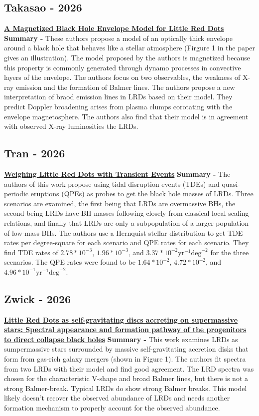 \documentclass{article}
\begin{document}
\subsection*{Takasao - 2026}
\href{https://ui.adsabs.harvard.edu/abs/2026arXiv260521589T}{\textbf{A Magnetized Black Hole Envelope Model for Little Red Dots}}
\newline \textbf{Summary -} These authors propose a model of an optically thick envelope around a black hole that behaves like a stellar atmosphere (Firgure 1 in the paper gives an illustration). The model proposed by the authors is magnetized because this property is commonly generated through dynamo processes in convective layers of the envelope. The authors focus on two observables, the weakness of X-ray emission and the formation of Balmer lines. The authors propose a new interpretation of braod emission lines in LRDs based on their model. They predict Doppler broadening arises from plasma clumps corotating with the envelope magnetosphere. The authors also find that their model is in agreement with observed X-ray luminosities the LRDs.

\subsection*{Tran - 2026}
\href{https://arxiv.org/abs/2609.00113}{\textbf{Weighing Little Red Dots with Transient Events}}
\newline \textbf{Summary -} The authors of this work propose using tidal disruption events (TDEs) and quasi-periodic eruptions (QPEs) as probes to get the black hole masses of LRDs. Three scenarios are examined, the first being that LRDs are overmassive BHs, the second being LRDs have BH masses following closely from classical local scaling relations, and finally that LRDs are only a subpopulation of a larger population of low-mass BHs. The authors use a Hernquist stellar distribution to get TDE rates per degree-square for each scenario and QPE rates for each scenario. They find TDE rates of $2.78*10^{-3}$, $1.96*10^{-3}$, and $3.37*10^{-2} \text{yr}^{-1} \text{deg}^{-2}$ for the three scenarios. The QPE rates were found to be $1.64*10^{-2}$, $4.72*10^{-2}$, and $4.96 * 10^{-1} \text{yr}^{-1} \text{deg}^{-2}$.

\subsection*{Zwick - 2026}
\href{https://ui.adsabs.harvard.edu/abs/2026ApJ..1002....7Z}{\textbf{Little Red Dots as self-gravitating discs accreting on supermassive stars: Spectral appearance and formation pathway of the progenitors to direct collapse black holes}}
\newline \textbf{Summary -} This work examines LRDs as sumpermassive stars surrounded by massive self-gravitating accretion disks that form from gas-rich galaxy mergers (shown in Figure 1). The authors fit spectra from two LRDs with their model and find good agreement. The LRD spectra was chosen for the characteristic V-shape and broad Balmer lines, but there is not a strong Balmer-break. Typical LRDs do show strong Balmer breaks. This model likely doesn't recover the observed abundance of LRDs and needs another formation mechanism to properly account for the observed abundance.
\end{document}
